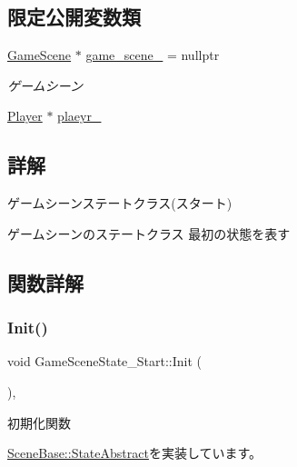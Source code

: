 \subsection*{限定公開変数類}
\begin{DoxyCompactItemize}
\item 
\mbox{\hyperlink{class_game_scene}{Game\+Scene}} $\ast$ \mbox{\hyperlink{class_game_scene_state___start_af9389c7c8496419a6a4a3d3339acd94f}{game\+\_\+scene\+\_\+}} = nullptr
\begin{DoxyCompactList}\small\item\em ゲームシーン \end{DoxyCompactList}\item 
\mbox{\hyperlink{class_player}{Player}} $\ast$ \mbox{\hyperlink{class_game_scene_state___start_a55544e766cf6dce7f69f1af6de20a903}{plaeyr\+\_\+}}
\end{DoxyCompactItemize}


\subsection{詳解}
ゲームシーンステートクラス(スタート) 

ゲームシーンのステートクラス 最初の状態を表す 

\subsection{関数詳解}
\mbox{\label{class_game_scene_state___start_ae921c57f349fbb2f00a197d40a3404b7}} 
\subsubsection{\texorpdfstring{Init()}{Init()}}
{\footnotesize\ttfamily void Game\+Scene\+State\+\_\+\+Start\+::\+Init (\begin{DoxyParamCaption}{ }\end{DoxyParamCaption})\hspace{0.3cm}{\ttfamily [override]}, {\ttfamily [virtual]}}



初期化関数 



\mbox{\hyperlink{class_scene_base_1_1_state_abstract_a2f5ea12e789aa52df179e6df469b870d}{Scene\+Base\+::\+State\+Abstract}}を実装しています。

